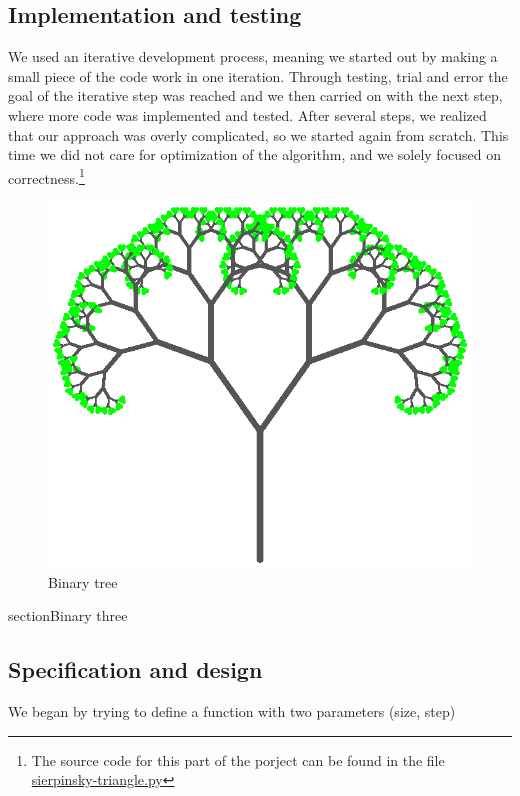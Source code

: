 \documentclass[titlepage]{article}
\begin{document}
\subsection{Implementation and testing}
We used an iterative development process, meaning we started out by making a small piece of the code work in one iteration. Through testing, trial and error the goal of the iterative step was reached and we then carried on with the next step, where more code was implemented and tested. After several steps, we realized that our approach was overly complicated, so we started again from scratch. This time we did not care for optimization of the algorithm, and we solely focused on correctness.\footnote{The source code for this part of the porject can be found in the file \href{https://github.com/ErikAndersen81/DM550-FractalProject/blob/master/sierpinsky-triangle.py}{sierpinsky-triangle.py}}
\begin{figure}[H]
  \centering
  \includegraphics{bintree}
  \caption{Binary tree}
\end{figure}
section{Binary three}
\subsection{Specification and design}
We began by trying to define a function with two parameters (size, step)
\end{document}
